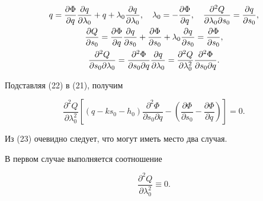 \begin{gather}


q=\frac{\partial \Phi}{\partial q} \frac{\partial q}{\partial


\lambda_0} + q +\lambda_0 \frac{\partial q}{\partial


\lambda_0},  \quad \lambda_0 = - \frac{\partial \Phi}{\partial


q},  \quad \frac{{\partial}^2 Q}{\partial \lambda_0 \partial


s_0}= \frac{\partial q}{\partial s_0},\notag \\


\frac{\partial Q}{\partial s_0}= \frac{\partial \Phi}{\partial


q} \frac{\partial q}{\partial s_0} + \frac{\partial


\Phi}{\partial s_0} + \lambda_0 \frac{\partial q}{\partial


s_0} = \frac{\partial \Phi}{\partial s_0},\\


\frac{{\partial}^2 Q}{\partial s_0 \partial


\lambda_0} = \frac{{\partial}^2 \Phi}{\partial s_0 \partial


q} \frac{\partial q}{\partial \lambda_0} =  \frac{{\partial}^2


Q}{\partial \lambda_0^2} \frac{{\partial}^2 \Phi}{\partial


s_0 \partial q}.\notag


\end{gather}


Подставляя (22) в (21),  получим


\begin{equation}


\frac{{\partial}^2 Q}{\partial


\lambda_0^2} \left[(q - k s_0 - h_0) \frac{{\partial}^2


\Phi}{\partial s_0 \partial q} -  \left(\frac{\partial


\Phi}{\partial s_0} - \frac{\partial \Phi}{\partial


q}\right)\right] = 0.


\end{equation}


Из (23) очевидно следует,  что могут иметь место два случая.





В первом случае выполняется соотношение


\[


\frac{{\partial}^2 Q}{\partial \lambda_0^2} \equiv 0.


\]


